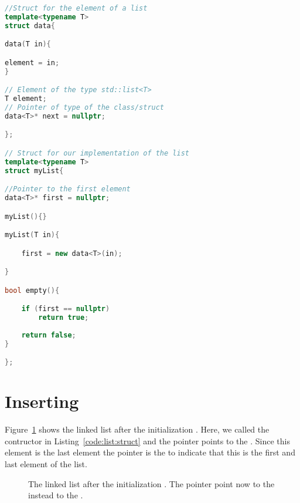 \documentclass[11pt,fleqn]{book} %
\begin{document}
\begin{lstlisting}[language=c++,caption={Example for a structure for a three dimensional vector.\label{code:list:struct}},float,floatplacement=tb]
//Struct for the element of a list
template<typename T>
struct data{

data(T in){

element = in;
}

// Element of the type std::list<T>
T element;
// Pointer of type of the class/struct
data<T>* next = nullptr;

};

// Struct for our implementation of the list
template<typename T>
struct myList{

//Pointer to the first element
data<T>* first = nullptr;

myList(){}

myList(T in){

	first = new data<T>(in);

}

bool empty(){

	if (first == nullptr)
		return true;
	
	return false;
}

};
\end{lstlisting}

\section*{Inserting}

Figure~\ref{fig:sketch:linked:list:init} shows the linked list after the initialization . Here, we called the contructor in Listing~\ref{code:list:struct} and the pointer  points to the . Since this element is the last element the pointer  is the  to indicate that this is the first and last element of the list.

\begin{figure}[h]
\centering
{}
\caption{The linked list after the initialization . The pointer  point now to the  instead to the .}
\label{fig:sketch:linked:list:init}
\end{figure}
\end{document}
